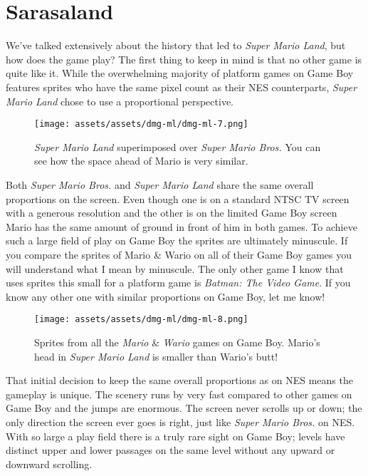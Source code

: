 \documentclass{book}
\begin{document}
\FloatBarrier\needspace{5pt}\section*{Sarasaland}\nopagebreak[4]

We’ve talked extensively about the history that led to \emph{Super Mario Land}, but how does the game play? The first thing to keep in mind is that no other game is quite like it. While the overwhelming majority of platform games on Game Boy features sprites who have the same pixel count as their NES counterparts, \emph{Super Mario Land} chose to use a proportional perspective.

\begin{figure}[hbt]
\vskip 10pt
\centering \texttt{[image: assets/assets/dmg-ml/dmg-ml-7.png]}\par\pagetwodescription \emph{Super Mario Land} superimposed over \emph{Super Mario Bros.} You can see how the space ahead of Mario is very similar.
\vskip 6pt
\end{figure}

Both \emph{Super Mario Bros.} and \emph{Super Mario Land} share the same overall proportions on the screen. Even though one is on a standard NTSC TV screen with a generous resolution and the other is on the limited Game Boy screen Mario has the same amount of ground in front of him in both games. To achieve such a large field of play on Game Boy the sprites are ultimately minuscule. If you compare the sprites of Mario \& Wario on all of their Game Boy games you will understand what I mean by minuscule. The only other game I know that uses sprites this small for a platform game is \emph{Batman: The Video Game}. If you know any other one with similar proportions on Game Boy, let me know!

\begin{figure}[hbt]
\vskip 10pt
\centering \texttt{[image: assets/assets/dmg-ml/dmg-ml-8.png]}\par\pagetwodescription Sprites from all the \emph{Mario} \& \emph{Wario} games on Game Boy. Mario’s head in \emph{Super Mario Land} is smaller than Wario’s butt!
\vskip 6pt
\end{figure}

That initial decision to keep the same overall proportions as on NES means the gameplay is unique. The scenery runs by very fast compared to other games on Game Boy and the jumps are enormous. The screen never scrolls up or down; the only direction the screen ever goes is right, just like \emph{Super Mario Bros.} on NES. With so large a play field there is a truly rare sight on Game Boy; levels have distinct upper and lower passages on the same level without any upward or downward scrolling.
\end{document}
